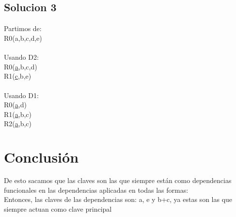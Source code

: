 \documentclass[a4paper,10pt]{article}
\begin{document}
\subsection{Solucion 3}
\paragraph{}Partimos de:\\
R0(a,b,c,d,e)
\paragraph{}Usando D2:\\
R0(\underline{a},b,c,d)\\
R1(\underline{c},b,e)
\paragraph{}Usando D1:\\
R0(\underline{a},d)\\
R1(\underline{a},b,c)\\
R2(\underline{a},b,c)
\pagebreak
\section{Conclusión}
De esto sacamos que las claves son las que siempre están como dependencias funcionales en las dependencias aplicadas en todas las formas:\\
Entonces, las claves de las dependencias son: a, e y b+c, ya estas son las que siempre actuan como clave principal
\end{document}
